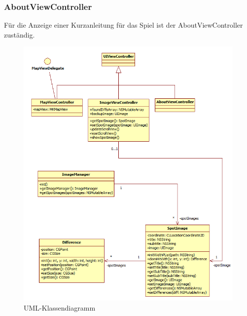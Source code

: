 \subsubsection*{AboutViewController}
Für die Anzeige einer Kurzanleitung für das Spiel ist der AboutViewController zuständig.


\begin{figure}[H]
  \centering
  \includegraphics[width=1.0\textwidth]{bilder/uml.png}
  \caption{UML-Klassendiagramm}
  \label{uml}
\end{figure}